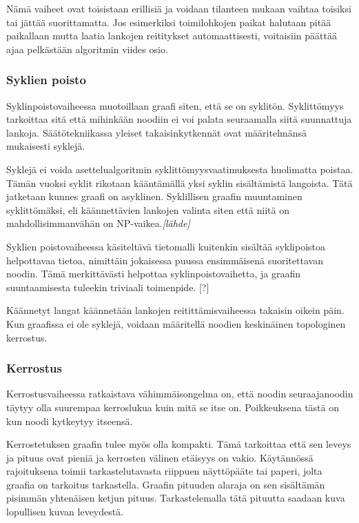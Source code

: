 \documentclass[finnish,12pt]{article}
\begin{document}
Nämä vaiheet ovat toisistaan erillisiä ja voidaan tilanteen mukaan vaihtaa toisiksi tai jättää suorittamatta.
Jos esimerkiksi toimilohkojen paikat halutaan pitää paikallaan mutta laatia lankojen reititykset automaattisesti, voitaisiin päättää ajaa pelkästään algoritmin viides osio.

		
		\subsubsection{Syklien poisto}

Syklinpoistovaiheessa muotoillaan graafi siten, että se on syklitön.
Syklittömyys tarkoittaa sitä että mihinkään noodiin ei voi palata seuraamalla siitä suunnattuja lankoja.
Säätötekniikassa yleiset takaisinkytkennät ovat määritelmänsä mukaisesti syklejä.

Syklejä ei voida asettelualgoritmin syklittömyysvaatimuksesta huolimatta poistaa.
Tämän vuoksi syklit rikotaan kääntämällä yksi syklin sisältämistä langoista.
Tätä jatketaan kunnes graafi on asyklinen.
Syklillisen graafin muuntaminen syklittömäksi, eli käännettävien lankojen valinta siten että niitä on mahdollisimmanvähän on NP-vaikea.\emph{[lähde]}

Syklien poistovaiheessa käsiteltävä tietomalli kuitenkin sisältää syklipoistoa helpottavaa tietoa, nimittäin jokaisessa puussa ensimmäisenä suoritettavan noodin. Tämä merkittävästi helpottaa syklinpoistovaihetta, ja graafin suuntaamisesta tuleekin triviaali toimenpide. [?]

Käännetyt langat käännetään lankojen reitittämisvaiheessa takaisin oikein päin.
Kun graafissa ei ole syklejä, voidaan määritellä noodien keskinäinen topologinen kerrostus.

		\subsubsection{Kerrostus}

Kerrostusvaiheessa ratkaistava vähimmäisongelma on, että noodin seuraajanoodin täytyy olla suurempaa kerroslukua kuin mitä se itse on.
Poikkeuksena tästä on kun noodi kytkeytyy itseensä.

Kerrostetuksen graafin tulee myös olla kompakti. Tämä tarkoittaa että sen leveys ja pituus ovat pieniä ja kerrosten välinen etäisyys on vakio. 
Käytännössä rajoituksena toimii tarkastelutavasta riippuen näyttöpääte tai paperi, jolta graafia on tarkoitus tarkastella.
Graafin pituuden alaraja on sen sisältämän pisimmän yhtenäisen ketjun pituus. Tarkastelemalla tätä pituutta saadaan kuva lopullisen kuvan leveydestä.
\end{document}
